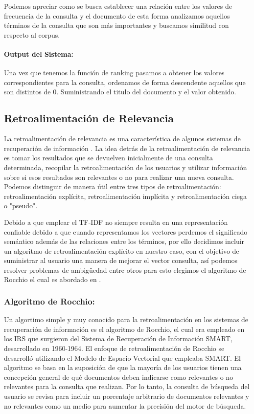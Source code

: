 \documentclass[runningheads,a4paper]{llncs}
\begin{document}
Podemos apreciar como se busca establecer una relación entre los valores de frecuencia de la consulta y el documento de esta forma analizamos aquellos términos de la consulta que son más importantes y buscamos similitud con respecto al corpus.

\paragraph{Output del Sistema:} Una vez que tenemos la función de ranking pasamos a obtener los valores correspondientes para la consulta, ordenamos de forma descendente aquellos que son distintos de 0. Suministrando el titulo del documento y el valor obtenido.

\subsection*{Retroalimentación de Relevancia}

La retroalimentación de relevancia es una característica de algunos sistemas de recuperación de información . La idea detrás de la retroalimentación de relevancia es tomar los resultados que se devuelven inicialmente de una consulta determinada, recopilar la retroalimentación de los usuarios y utilizar información sobre si esos resultados son relevantes o no para realizar una nueva consulta. Podemos distinguir de manera útil entre tres tipos de retroalimentación: retroalimentación explícita, retroalimentación implícita y retroalimentación ciega o "pseudo".

Debido a que emplear el TF-IDF no siempre resulta en una representación confiable debido a que cuando representamos los vectores perdemos el significado semántico además de las relaciones entre los términos, por ello decidimos incluir un algoritmo de retroalimentación explícito en nuestro caso, con el objetivo de suministrar al usuario una manera de mejorar el vector consulta, así podemos resolver problemas de ambigüedad entre otros para esto elegimos el algoritmo de Rocchio el cual es abordado en \cite{rocchio}.

\subsubsection*{Algoritmo de Rocchio:} Un algortimo simple y muy conocido para la retroalimentación en los sistemas de recuperación de información es el algoritmo de Rocchio, el cual era empleado en los IRS que surgieron del Sistema de Recuperación de Información SMART, desarrollado en 1960-1964. El enfoque de retroalimentación de Rocchio se desarrolló utilizando el Modelo de Espacio Vectorial que empleaba SMART. El algoritmo se basa en la suposición de que la mayoría de los usuarios tienen una concepción general de qué documentos deben indicarse como relevantes o no relevantes para la consulta que realizan. Por lo tanto, la consulta de búsqueda del usuario se revisa para incluir un porcentaje arbitrario de documentos relevantes y no relevantes como un medio para aumentar la precisión del motor de búsqueda.
\end{document}
